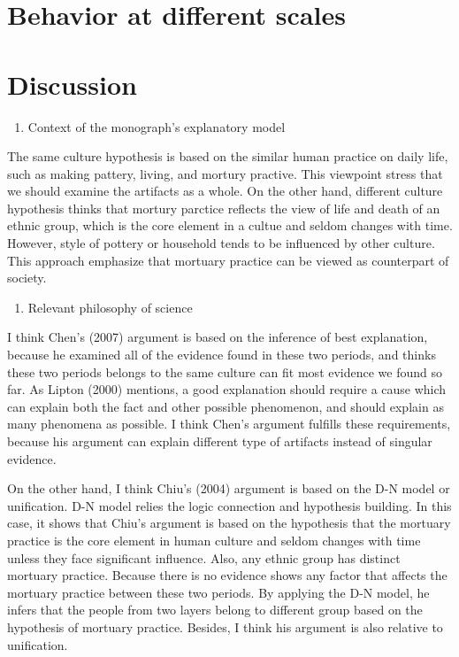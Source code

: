 \documentclass[10pt]{article}
\begin{document}
\section{Behavior at different
scales}\label{behavior-at-different-scales}

\section*{Discussion}\label{discussion}

\begin{enumerate}
\def\labelenumi{\arabic{enumi}.}
\itemsep1pt\parskip0pt
\item
  Context of the monograph's explanatory model
\end{enumerate}

The same culture hypothesis is based on the similar human practice on
daily life, such as making pattery, living, and mortury practive. This
viewpoint stress that we should examine the artifacts as a whole. On the
other hand, different culture hypothesis thinks that mortury parctice
reflects the view of life and death of an ethnic group, which is the
core element in a cultue and seldom changes with time. However, style of
pottery or household tends to be influenced by other culture. This
approach emphasize that mortuary practice can be viewed as counterpart
of society.

\begin{enumerate}
\def\labelenumi{\arabic{enumi}.}
\setcounter{enumi}{1}
\itemsep1pt\parskip0pt
\item
  Relevant philosophy of science
\end{enumerate}

I think Chen's (2007) argument is based on the inference of best
explanation, because he examined all of the evidence found in these two
periods, and thinks these two periods belongs to the same culture can
fit most evidence we found so far. As Lipton (2000) mentions, a good
explanation should require a cause which can explain both the fact and
other possible phenomenon, and should explain as many phenomena as
possible. I think Chen's argument fulfills these requirements, because
his argument can explain different type of artifacts instead of singular
evidence.

On the other hand, I think Chiu's (2004) argument is based on the D-N
model or unification. D-N model relies the logic connection and
hypothesis building. In this case, it shows that Chiu's argument is
based on the hypothesis that the mortuary practice is the core element
in human culture and seldom changes with time unless they face
significant influence. Also, any ethnic group has distinct mortuary
practice. Because there is no evidence shows any factor that affects the
mortuary practice between these two periods. By applying the D-N model,
he infers that the people from two layers belong to different group
based on the hypothesis of mortuary practice. Besides, I think his
argument is also relative to unification.
\end{document}
